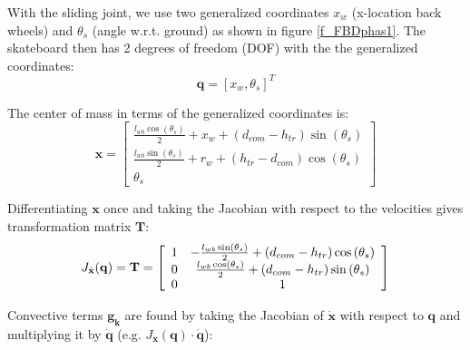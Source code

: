 \documentclass[default,iicol]{sn-jnl}
\begin{document}
With the sliding joint, we use two generalized coordinates $x_w$ (x-location
back wheels) and $\theta_s$ (angle w.r.t. ground) as shown in figure
\ref{f_FBDphas1}.
The skateboard then has 2 degrees of freedom (DOF) with the the generalized
coordinates:
%
\begin{equation}
    \mathbf{q} = [x_w, \theta_s]^T
\end{equation}

The center of mass in terms of the generalized coordinates is:
%
\begin{equation}
\mathbf{x}=\left[\begin{array}{c}
\frac{l_{w b} \cos \left(\theta_s\right)}{2}+x_w+\left(d_{c o m}-h_{t r}\right) \sin \left(\theta_s\right) \\
\frac{l_{w b} \sin \left(\theta_s\right)}{2}+r_w+\left(h_{t r}-d_{c o m}\right) \cos \left(\theta_s\right) \\
\theta_s
\end{array}\right]
\end{equation}

Differentiating $\mathbf{x}$ once and taking the Jacobian with respect to the
velocities gives transformation matrix $\mathbf{T}$:
%
\begin{equation}
    J_{\dot{\mathbf{x}}}(\mathbf{q}) = \textbf{T} = \left[\begin{array}{c c}
1 & -\frac{l_{w b} \sin \left(\theta_s\right)}{2}+\left(d_{c o m}-h_{t r}\right) \cos \left(\theta_s\right) \\
0 & \frac{l_{w b} \cos \left(\theta_s\right)}{2}+\left(d_{c o m}-h_{t r}\right) \sin \left(\theta_s\right) \\
0 & 1
\end{array}\right]
\end{equation}

Convective terms $\mathbf{g_k}$ are found by taking the Jacobian of $\mathbf{\dot  x}$ with respect to $\mathbf{q}$ and multiplying it by $\mathbf{\dot  q}$ (e.g. $J_{\mathbf{\dot  x}}(\mathbf{q})\cdot \mathbf{\dot  q}$):
\end{document}
